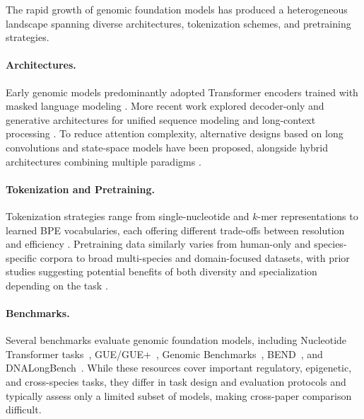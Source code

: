 \documentclass{article}
\theoremstyle{plain}
\theoremstyle{definition}
\theoremstyle{remark}
\begin{document}
The rapid growth of genomic foundation models has produced a 
heterogeneous landscape spanning diverse architectures, tokenization 
schemes, and pretraining strategies.

\paragraph{Architectures.}
Early genomic models predominantly adopted Transformer encoders trained with masked language modeling \citep{zhou2024dnabert2efficientfoundationmodel,dalla2023nucleotide,GENA_LM,sanabria2024grover}. More recent work explored decoder-only and generative architectures for unified sequence modeling and long-context processing \citep{zhang2023dnagptgeneralizedpretrainedtool,nguyen2024sequence,wu2025generatorlongcontextgenerativegenomic,Zhou2025.01.30.635558,li2025omnidnaunifiedgenomicfoundation}. To reduce attention complexity, alternative designs based on long convolutions and state-space models have been proposed, alongside hybrid architectures combining multiple paradigms \citep{nguyen2023hyenadnalongrangegenomicsequence,schiff2024caduceusbidirectionalequivariantlongrange,liu2025eccdnamambapretrainedmodelultralong,duan2025janusdnapowerfulbidirectionalhybrid,vishniakov2025gene42longrangegenomicfoundation}.

\paragraph{Tokenization and Pretraining.}
Tokenization strategies range from single-nucleotide and $k$-mer representations to learned BPE vocabularies, each offering different trade-offs between resolution and efficiency \citep{zhou2024dnabert2efficientfoundationmodel,Zhou2025.01.30.635558}. Pretraining data similarly varies from human-only and species-specific corpora to broad multi-species and domain-focused datasets, with prior studies suggesting potential benefits of both diversity and specialization depending on the task \citep{dalla2023nucleotide,wu2025generatorlongcontextgenerativegenomic,avsec2021enformer,doi:10.1073/pnas.2421738122}.

\paragraph{Benchmarks.}
Several benchmarks evaluate genomic foundation models, including Nucleotide Transformer tasks~\citep{dalla2023nucleotide}, GUE/GUE+~\citep{zhou2024dnabert2efficientfoundationmodel}, Genomic Benchmarks~\citep{Gresova2022.06.08.495248}, BEND~\citep{marin2024bendbenchmarkingdnalanguage}, and DNALongBench~\citep{Cheng2025.01.06.631595}. While these resources cover important regulatory, epigenetic, and cross-species tasks, they differ in task design and evaluation protocols and typically assess only a limited subset of models, making cross-paper comparison difficult.
\end{document}
